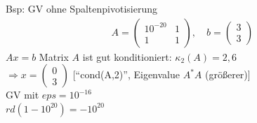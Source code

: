 Bsp: GV ohne Spaltenpivotisierung
\begin{align*}
  A = \begin{pmatrix}
    10^{-20} & 1\\
    1        & 1
  \end{pmatrix}
  ,\quad b = \begin{pmatrix} 3 \\ 3 \end{pmatrix}
\end{align*}
$Ax = b$ Matrix $A$ ist gut konditioniert: $\kappa_2(A) = 2,6$\\
$\Rightarrow x = \begin{pmatrix} 0 \\ 3 \end{pmatrix}$ [``cond(A,2)'', Eigenvalue $A^* A$ (größerer)]\\
GV mit $eps = 10^{-16}$\\
$rd(1-10^{20}) = -10^{20}$

